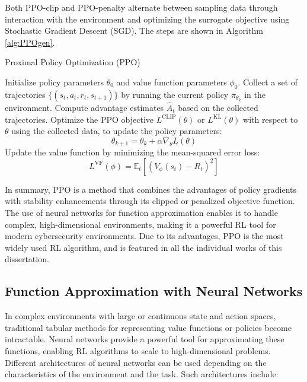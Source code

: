 Both PPO-clip and PPO-penalty alternate between sampling data through interaction with the environment and optimizing the surrogate objective using Stochastic Gradient Descent (\gls{SGD}).
The steps are shown in Algorithm \ref{alg:PPOgen}.

\begin{algorithm}
\caption{Proximal Policy Optimization (PPO)}
\label{alg:PPOgen}
\begin{algorithmic}[1]
\STATE Initialize policy parameters $\theta_0$ and value function parameters $\phi_0$.
    \STATE Collect a set of trajectories $\{(s_t, a_t, r_t, s_{t+1})\}$ by running the current policy $\pi_{\theta_k}$ in the environment.
    \STATE Compute advantage estimates $\hat{A}_t$ based on the collected trajectories.
    \setlength{\abovedisplayskip}{3pt}
    \setlength{\belowdisplayskip}{3pt}
    \STATE Optimize the PPO objective $L^{\text{CLIP}}(\theta)$ or $L^{\text{KL}}(\theta)$ with respect to $\theta$ using the collected data, to update the policy parameters:
    \[
    \theta_{k+1} = \theta_k + \alpha \nabla_\theta L(\theta)
    \]
    \STATE Update the value function by minimizing the mean-squared error loss:
    \[
    L^{\text{VF}}(\phi) = \mathbb{E}_t \left[ (V_{\phi}(s_t) - R_t)^2 \right]
    \]
\ENDFOR
\end{algorithmic}
\end{algorithm}

In summary, \gls{PPO} is a method that combines the advantages of policy gradients with stability enhancements through its clipped or penalized objective function.
The use of neural networks for function approximation enables it to handle complex, high-dimensional environments, making it a powerful \gls{RL} tool for modern cybersecurity environments.
Due to its advantages, \gls{PPO} is the most widely used RL algorithm, and is featured in all the individual works of this dissertation.

\subsection{Function Approximation with Neural Networks}

In complex environments with large or continuous state and action spaces, traditional tabular methods for representing value functions or policies become intractable.
Neural networks provide a powerful tool for approximating these functions, enabling RL algorithms to scale to high-dimensional problems.
Different architectures of neural networks can be used depending on the characteristics of the environment and the task.
Such architectures include:

